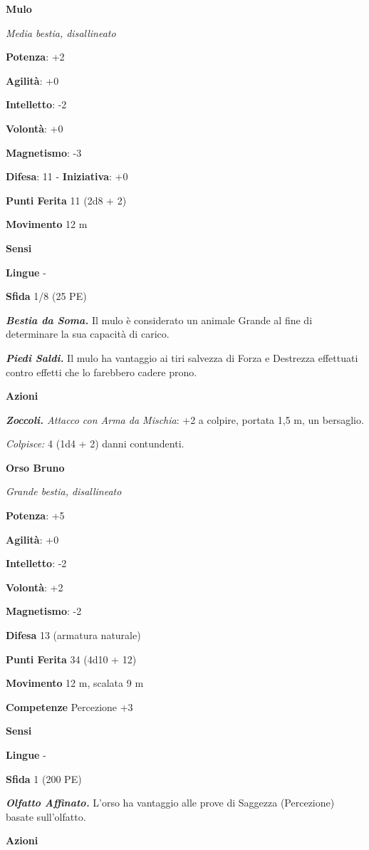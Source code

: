 \begin{multicols}{2}
\textbf{Mulo}

\emph{Media bestia, disallineato}

\textbf{Potenza}: +2

\textbf{Agilità}: +0

\textbf{Intelletto}: -2

\textbf{Volontà}: +0

\textbf{Magnetismo}: -3

\textbf{Difesa}: 11 - \textbf{Iniziativa}: +0

\textbf{Punti Ferita} 11 (2d8 + 2)

\textbf{Movimento} 12 m

\textbf{Sensi} 

\textbf{Lingue} -

\textbf{Sfida} 1/8 (25 PE)

\emph{\textbf{Bestia da Soma.}} Il mulo è considerato un animale Grande
al fine di determinare la sua capacità di carico.

\emph{\textbf{Piedi Saldi.}} Il mulo ha vantaggio ai tiri salvezza di
Forza e Destrezza effettuati contro effetti che lo farebbero cadere
prono.

\textbf{Azioni}

\emph{\textbf{Zoccoli.} Attacco con Arma da Mischia}: +2 a colpire,
portata 1,5 m, un bersaglio.

\emph{Colpisce:} 4 (1d4 + 2) danni contundenti.

\textbf{Orso Bruno}

\emph{Grande bestia, disallineato}

\textbf{Potenza}: +5

\textbf{Agilità}: +0

\textbf{Intelletto}: -2

\textbf{Volontà}: +2

\textbf{Magnetismo}: -2

\textbf{Difesa} 13 (armatura naturale)

\textbf{Punti Ferita} 34 (4d10 + 12)

\textbf{Movimento} 12 m, scalata 9 m

\textbf{Competenze} Percezione +3

\textbf{Sensi} 

\textbf{Lingue} -

\textbf{Sfida} 1 (200 PE)

\emph{\textbf{Olfatto Affinato.}} L'orso ha vantaggio alle prove di
Saggezza (Percezione) basate sull'olfatto.

\textbf{Azioni}


\end{multicols}
